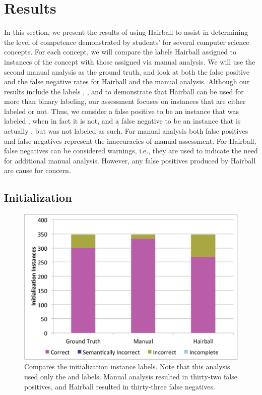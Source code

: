 \section{Results}

In this section, we present the results of using Hairball to assist in
determining the level of competence demonstrated by students'  for
several computer science concepts. For each concept, we will compare the labels
Hairball assigned to instances of the concept with those assigned via manual
analysis. We will use the second manual analysis as the ground truth, and look
at both the false positive and the false negative rates for Hairball and the
manual analysis. Although our results include the labels \semincor{}, \incor{},
and \incom{} to demonstrate that Hairball can be used for more than binary
labeling, our assessment focuses on instances that are either labeled
\correct{} or not. Thus, we consider a false positive to be an instance that
was labeled \correct{}, when in fact it is not, and a false negative to be an
instance that is actually \correct{}, but was not labeled as such. For manual
analysis both false positives and false negatives represent the inaccuracies of
manual assessment. For Hairball, false negatives can be considered warnings,
i.e., they are used to indicate the need for additional manual
analysis. However, any false positives produced by Hairball are cause for
concern.


\subsection{Initialization}
\begin{figure}[!t]
\centering
\includegraphics[trim=.3in .15in .3in .15in, clip,
  width=5.25in]{graphs/AutoInit.eps}
\caption{Compares the initialization instance labels. Note that this analysis
  used only the \correct{} and \incor{} labels. Manual analysis resulted in
  thirty-two false positives, and Hairball resulted in thirty-three false
  negatives.}
\end{figure}

